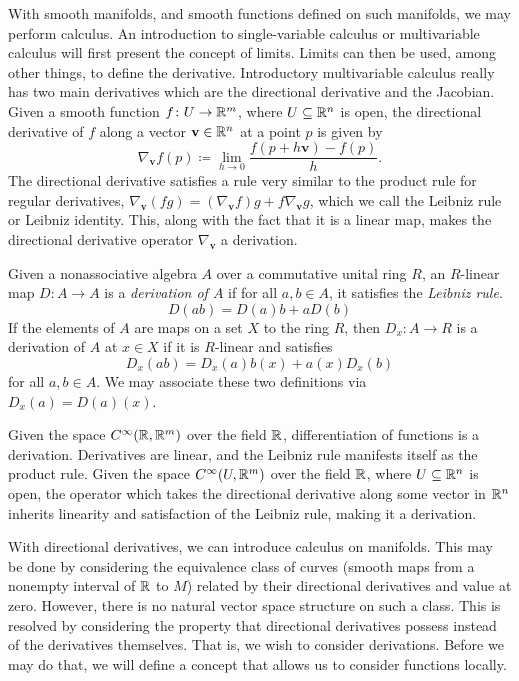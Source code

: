 \documentclass[a4paper,12pt]{article}
\begin{document}
With smooth manifolds, and smooth functions defined on such manifolds, we may perform calculus.
An introduction to single-variable calculus or multivariable calculus will first present the concept of limits.
Limits can then be used, among other things, to define the derivative.
Introductory multivariable calculus really has two main derivatives which are the directional derivative and the Jacobian.
Given a smooth function $f \colon U \to \mathbb{R}^m$, where $U \subseteq \mathbb{R}^n$ is open, the directional derivative of $f$ along a vector $\mathbf{v} \in \mathbb{R}^n$ at a point $p$ is given by
\begin{equation}
    \nabla_\mathbf{v}f(p) \coloneq \lim_{h \to 0} \frac{f(p + h\mathbf{v}) - f(p)}{h}.
\end{equation}
The directional derivative satisfies a rule very similar to the product rule for regular derivatives, $\nabla_\mathbf{v}(fg) = (\nabla_\mathbf{v}f) g + f \nabla_\mathbf{v}g$, which we call the Leibniz rule or Leibniz identity.
This, along with the fact that it is a linear map, makes the directional derivative operator $\nabla_\mathbf{v}$ a derivation.
\begin{definition}[Derivation]\label{def:derivation}
    Given a nonassociative algebra $A$ over a commutative unital ring $R$, an $R$-linear map $D \colon A \to A$ is a \emph{derivation of $A$} if for all $a, b \in A$, it satisfies the \emph{Leibniz rule}.
    \begin{equation}
        D(ab) = D(a)b + aD(b)
    \end{equation}
    If the elements of $A$ are maps on a set $X$ to the ring $R$, then $D_x \colon A \to R$ is a derivation of $A$ at $x \in X$ if it is $R$-linear and satisfies
    \begin{equation}
        D_x(ab) = D_x(a)b(x) + a(x)D_x(b)
    \end{equation}
    for all $a, b \in A$.
    We may associate these two definitions via $D_x(a) = D(a)(x)$.
\end{definition}
\begin{example}\label{ex:derivation}
    Given the space $C^\infty(\mathbb{R}, \mathbb{R}^m)$ over the field $\mathbb{R}$, differentiation of functions is a derivation.
    Derivatives are linear, and the Leibniz rule manifests itself as the product rule.
    Given the space $C^\infty(U, \mathbb{R}^m)$ over the field $\mathbb{R}$, where $U \subseteq \mathbb{R}^n$ is open, the operator which takes the directional derivative along some vector in $\mathbb{R}^n$ inherits linearity and satisfaction of the Leibniz rule, making it a derivation.
\end{example}
With directional derivatives, we can introduce calculus on manifolds.
This may be done by considering the equivalence class of curves (smooth maps from a nonempty interval of $\mathbb{R}$ to $M$) related by their directional derivatives and value at zero.
However, there is no natural vector space structure on such a class.
This is resolved by considering the property that directional derivatives possess instead of the derivatives themselves.
That is, we wish to consider derivations.
Before we may do that, we will define a concept that allows us to consider functions locally.
\end{document}

